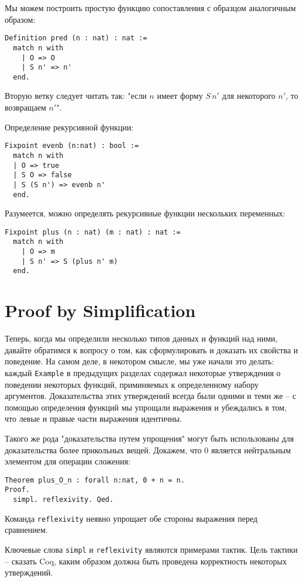 \documentclass[12pt,a4paper,draft]{article}
\begin{document}
Мы можем построить простую функцию сопоставления с образцом аналогичным образом:

\begin{verbatim}
Definition pred (n : nat) : nat :=
  match n with
    | O => O
    | S n' => n'
  end.
\end{verbatim}

Вторую ветку следует читать так: "если $n$ имеет форму $S \, n'$ для некоторого $n'$, то возвращаем $n'$".

Определение рекурсивной функции:

\begin{verbatim}
Fixpoint evenb (n:nat) : bool :=
  match n with
  | O => true
  | S O => false
  | S (S n') => evenb n'
  end.
\end{verbatim}

Разумеется, можно определять рекурсивные функции нескольких переменных:

\begin{verbatim}
Fixpoint plus (n : nat) (m : nat) : nat :=
  match n with
    | O => m
    | S n' => S (plus n' m)
  end.
\end{verbatim}

\section{Proof by Simplification}
Теперь, когда мы определили несколько типов данных и функций над ними, давайте обратимся к вопросу о том, как сформулировать и доказать их свойства и поведение. На самом деле, в некотором смысле, мы уже начали это делать: каждый \texttt{Example} в предыдущих разделах содержал некоторые утверждения о поведении некоторых функций, приминяемых к определенному набору аргументов. Доказательства этих утверждений всегда были одними и теми же -- с помощью определения функций мы упрощали выражения и убеждались в том, что левые и правые части выражения идентичны.

Такого же рода "доказательства путем упрощения" могут быть использованы для доказательства более прикольных вещей. Докажем, что 0 является нейтральным элементом для операции сложения:

\begin{verbatim}
Theorem plus_O_n : forall n:nat, 0 + n = n.
Proof.
  simpl. reflexivity. Qed.
\end{verbatim}

Команда \texttt{reflexivity} неявно упрощает обе стороны выражения перед сравнением.

Ключевые слова \texttt{simpl} и \texttt{reflexivity} являются примерами тактик. Цель тактики -- сказать Coq, каким образом должна быть проведена корректность некоторых утверждений.
\end{document}
